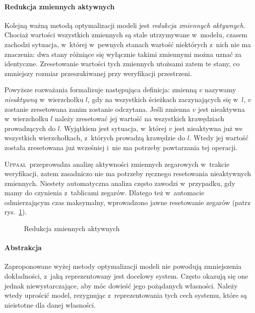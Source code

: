 \documentclass{pracamgr}
\newcommand{\imgr}[1]{rys.~\ref{#1}}
\newcommand{\upp}{\textsc{Uppaal}}
\theoremstyle{plain}
\begin{document}
\paragraph{Redukcja zmiennych aktywnych} Kolejną ważną metodą
optymalizacji modeli jest \emph{redukcja zmiennych aktywnych}.
Chociaż wartości wszystkich zmiennych są stale utrzymywane w~modelu,
czasem zachodzi sytuacja, w~której w~pewnych stanach wartość
niektórych z~nich nie ma znaczenia: dwa stany różniące się wyłącznie
takimi zmiennymi można uznać za identyczne. Zresetowanie wartości tych
zmiennych utożsami zatem te stany, co zmniejszy rozmiar przeszukiwanej
przy weryfikacji przestrzeni.

Powyższe rozważania formalizuje następująca definicja: zmienną $v$
nazywamy \emph{nieaktywną} w~wierzchołku $l$, gdy na wszystkich
ścieżkach zaczynających się w~$l$, $v$ zostanie zresetowana zanim
zostanie odczytana. Jeśli zmienna $v$ jest nieaktywna w~wierzchołku
$l$ należy zresetować jej wartość na wszystkich krawędziach
prowadzących do $l$. Wyjątkiem jest sytuacja, w~której $v$ jest
nieaktywna już we wszystkich wierzchołkach, z~których prowadzą
krawędzie do $l$. Wtedy jej wartość została zresetowana już wcześniej
i~nie ma potrzeby powtarzania tej operacji.

\upp\ przeprowadza analizę aktywności zmiennych zegarowych w~trakcie
weryfikacji, zatem zasadniczo nie ma potrzeby ręcznego resetowania
nieaktywnych zmiennych. Niestety automatyczna analiza często zawodzi
w~przypadku, gdy mamy do czynienia z~tablicami zegarów. Dlatego też
w~automacie odmierzającym czas maksymalny, wprowadzono jawne resetowanie
zegarów (patrz \imgr{img:models-active-reduction}).

\begin{figure}
  \centering
  \hfill
  \caption{Redukcja zmiennych aktywnych}
  \label{img:models-active-reduction}
\end{figure}

\paragraph{Abstrakcja} Zaproponowane wyżej metody optymalizacji modeli
nie powodują zmniejszenia dokładności, z~jaką reprezentowany jest
docelowy system. Często okazują się one jednak niewystarczające, aby
móc dowieść jego pożądanych własności. Należy wtedy uprościć model,
rezygnując z~reprezentowania tych cech systemu, które są nieistotne
dla danej własności.
\end{document}
